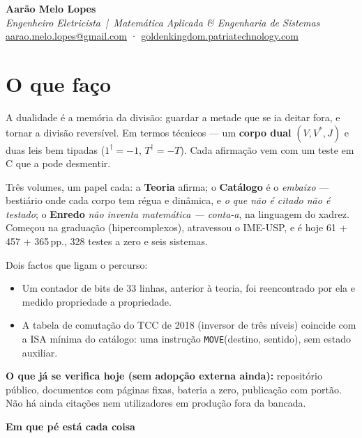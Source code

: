 \documentclass[11pt,a4paper]{article}
\newcommand{\lin}[2]{\noindent\textbf{#1}\hfill{\color{cinza}\small #2}\par}
\begin{document}

\begin{center}
{\LARGE\bfseries Aarão Melo Lopes}\\[2pt]
{\color{cinza}\emph{Engenheiro Eletricista \,|\, Matemática Aplicada \& Engenharia de Sistemas}}\\[2pt]
{\small
\href{mailto:aarao.melo.lopes@gmail.com}{aarao.melo.lopes@gmail.com}
\quad·\quad
\href{https://goldenkingdom.patriatechnology.com}{goldenkingdom.patriatechnology.com}}
\end{center}

\vspace{-2pt}
\section*{O que faço}

A dualidade é a memória da divisão: guardar a metade que se ia deitar fora, e tornar a
divisão reversível. Em termos técnicos --- um \textbf{corpo dual} $(V,V^{*},J)$ e duas leis
bem tipadas ($1^{\dagger}=-1$, $T^{\dagger}=-T$). Cada afirmação vem com um teste em C que a
pode desmentir.

\smallskip
Três volumes, um papel cada: a \textbf{Teoria} afirma; o \textbf{Catálogo} é o
\emph{embaixo} --- bestiário onde cada corpo tem régua e dinâmica, e
\emph{o que não é citado não é testado}; o \textbf{Enredo} \emph{não inventa matemática ---
conta-a}, na linguagem do xadrez. Começou na graduação (hipercomplexos), atravessou o
IME-USP, e é hoje 61 + 457 + 365\,pp., 328 testes a zero e seis sistemas.

\smallskip
Dois factos que ligam o percurso:
\begin{itemize}
\item Um contador de bits de 33 linhas, anterior à teoria, foi reencontrado por ela e medido
propriedade a propriedade.
\item A tabela de comutação do TCC de 2018 (inversor de três níveis) coincide com a ISA
mínima do catálogo: uma instrução \texttt{MOVE}(destino, sentido), sem estado auxiliar.
\end{itemize}

\smallskip
\noindent\textbf{O que já se verifica hoje (sem adopção externa ainda):}
repositório público, documentos com páginas fixas, bateria a zero, publicação com portão.
Não há ainda citações nem utilizadores em produção fora da bancada.

\lin{Em que pé está cada coisa}{}
\end{document}
